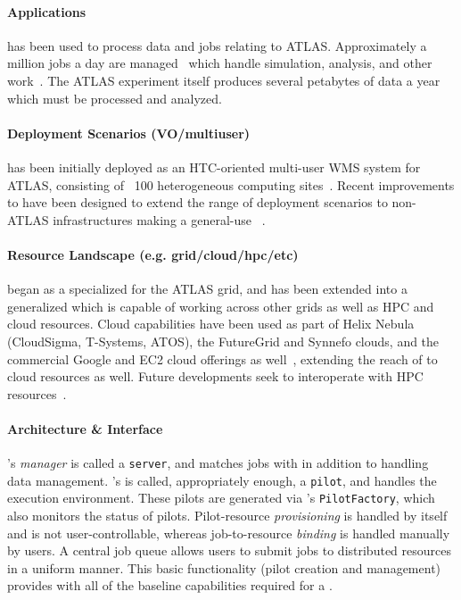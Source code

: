 \documentclass{sig-alternate}
\begin{document}
\paragraph{Applications}
\panda has been used to process data and jobs relating to ATLAS.  Approximately
a million jobs a day are managed~\cite{pandapresentation2013-06}
which handle simulation, analysis, and other work~\cite{maeno_pd2p:_2012}.
The ATLAS experiment itself produces several petabytes of data a year
which must be processed and analyzed.

\paragraph{Deployment Scenarios (VO/multiuser)}
\panda has been initially deployed as an HTC-oriented
multi-user
WMS system for ATLAS, consisting
of ~100 heterogeneous computing sites~\cite{maeno_pd2p:_2012}.
Recent improvements to \panda have been designed to extend
the range of deployment scenarios to non-ATLAS infrastructures
making \panda a general-use \pilotjob~\cite{nilsson2012recent}.

\paragraph{Resource Landscape (e.g. grid/cloud/hpc/etc)}
\panda began as a specialized \pilotjob for the ATLAS grid, and has been extended
into a generalized \pilotjob which is capable of working across other grids
as well as HPC and cloud resources.
Cloud capabilities have been used as part
of Helix Nebula (CloudSigma, T-Systems, ATOS),
the FutureGrid and Synnefo clouds, and the commercial
Google and EC2 cloud offerings as well~\cite{pandapresentation2013-06},
extending the reach of \panda to
cloud resources as well.  Future \panda developments seek
to interoperate with HPC resources~\cite{pandapresentation2013-06}.

\paragraph{Architecture \& Interface}
\panda's \textit{manager} is called a \texttt{\panda server}, and matches
jobs with \pilots in addition to handling data management.
\panda's \textit{\pilot}
is called, appropriately enough, a \texttt{pilot}, and handles the execution
environment.  These pilots are generated via \panda's \texttt{PilotFactory},
which also monitors the status of pilots.
Pilot-resource \textit{provisioning} is handled by \panda itself and is not
user-controllable, whereas job-to-resource \textit{binding} is handled
manually by users.
A central job queue allows users to submit jobs
to distributed resources in a uniform manner.
This basic functionality (pilot creation and management) provides
\panda with all of the baseline capabilities required for a \pilotjob.
\end{document}
